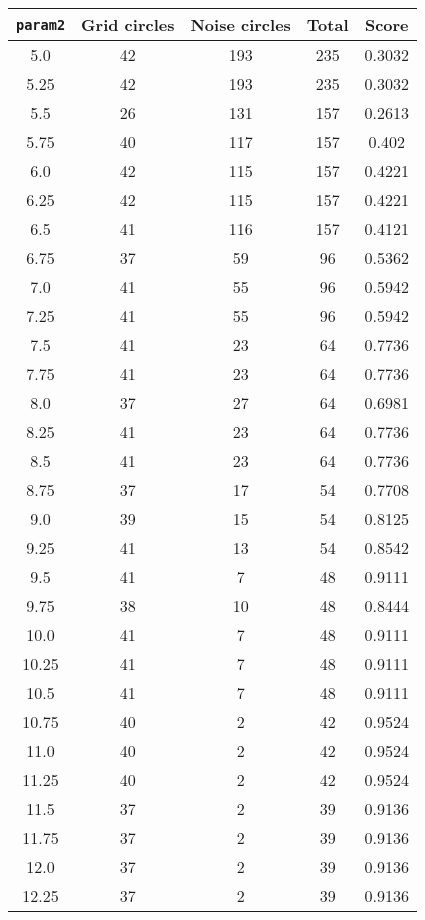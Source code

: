 \documentclass[letterpaper, 12pt]{article}
\begin{document}
\begin{longtable}{|c|c|c|c|c|}
\hline
\textbf{\texttt{param2}} & \textbf{Grid circles} & \textbf{Noise circles} & \textbf{Total} & \textbf{Score} \\
\hline
5.0 & 42 & 193 & 235 & 0.3032 \\
\hline
5.25 & 42 & 193 & 235 & 0.3032 \\
\hline
5.5 & 26 & 131 & 157 & 0.2613 \\
\hline
5.75 & 40 & 117 & 157 & 0.402 \\
\hline
6.0 & 42 & 115 & 157 & 0.4221 \\
\hline
6.25 & 42 & 115 & 157 & 0.4221 \\
\hline
6.5 & 41 & 116 & 157 & 0.4121 \\
\hline
6.75 & 37 & 59 & 96 & 0.5362 \\
\hline
7.0 & 41 & 55 & 96 & 0.5942 \\
\hline
7.25 & 41 & 55 & 96 & 0.5942 \\
\hline
7.5 & 41 & 23 & 64 & 0.7736 \\
\hline
7.75 & 41 & 23 & 64 & 0.7736 \\
\hline
8.0 & 37 & 27 & 64 & 0.6981 \\
\hline
8.25 & 41 & 23 & 64 & 0.7736 \\
\hline
8.5 & 41 & 23 & 64 & 0.7736 \\
\hline
8.75 & 37 & 17 & 54 & 0.7708 \\
\hline
9.0 & 39 & 15 & 54 & 0.8125 \\
\hline
9.25 & 41 & 13 & 54 & 0.8542 \\
\hline
9.5 & 41 & 7 & 48 & 0.9111 \\
\hline
9.75 & 38 & 10 & 48 & 0.8444 \\
\hline
10.0 & 41 & 7 & 48 & 0.9111 \\
\hline
10.25 & 41 & 7 & 48 & 0.9111 \\
\hline
10.5 & 41 & 7 & 48 & 0.9111 \\
\hline
10.75 & 40 & 2 & 42 & 0.9524 \\
\hline
11.0 & 40 & 2 & 42 & 0.9524 \\
\hline
11.25 & 40 & 2 & 42 & 0.9524 \\
\hline
11.5 & 37 & 2 & 39 & 0.9136 \\
\hline
11.75 & 37 & 2 & 39 & 0.9136 \\
\hline
12.0 & 37 & 2 & 39 & 0.9136 \\
\hline
12.25 & 37 & 2 & 39 & 0.9136 \\
\hline

\end{longtable}
\end{document}
